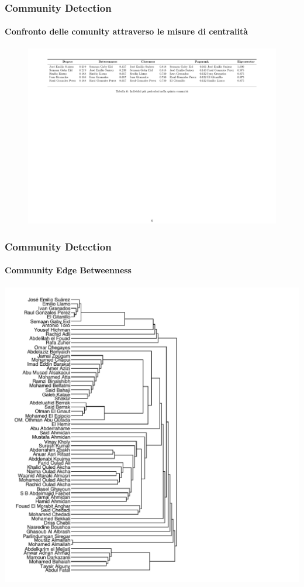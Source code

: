 \documentclass[hyperref={pdfpagelabels=false}]{beamer}
\begin{document}
\begin{frame}
\frametitle{Community Detection}
\framesubtitle{Confronto delle comunity attraverso le misure di centralità}
\begin{figure}
  \centering
    \includegraphics[width=1\textwidth]{images/provaC5.pdf}
\end{figure}

\end{frame}

\begin{frame}
\frametitle{Community Detection}
\framesubtitle{Community Edge Betweenness}
 \centering
\includegraphics[scale=0.35]{images/community_edge_betweenness.pdf}
\end{frame}
\end{document}
